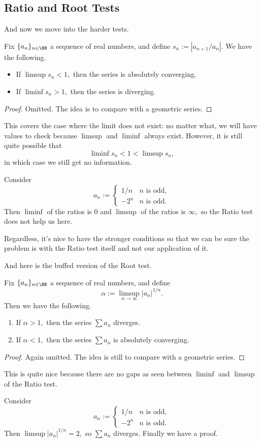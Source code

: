 \subsection{Ratio and Root Tests}
And now we move into the harder tests.
\begin{prop}
	Fix $\{a_n\}_{n\in\NN}$ a sequence of real numbers, and define $s_n:=|a_{n+1}/a_n|.$ We have the following.
	\begin{itemize}
		\item If $\limsup s_n<1,$ then the series is absolutely converging.
		\item If $\liminf s_n>1,$ then the series is diverging.
	\end{itemize}
\end{prop}
\begin{proof}
	Omitted. The idea is to compare with a geometric series.
\end{proof}
This covers the case where the limit does not exist: no matter what, we will have values to check because $\limsup$ and $\liminf$ always exist. However, it is still quite possible that
\[\liminf s_n<1<\limsup s_n,\]
in which case we still get no information.
\begin{nex}
	Consider
	\[a_n:=\begin{cases}
		1/n & n\text{ is odd}, \\
		-2^n & n\text{ is odd}.
	\end{cases}\]
	Then $\liminf$ of the ratios is $0$ and $\limsup$ of the ratios is $\infty,$ so the Ratio test does not help us here.
\end{nex}
Regardless, it's nice to have the stronger conditions so that we can be sure the problem is with the Ratio test itself and not our application of it.

And here is the buffed version of the Root test.
\begin{prop}
	Fix $\{a_n\}_{n\in\NN}$ a sequence of real numbers, and define
	\[\alpha:=\limsup_{n\to\infty}|a_n|^{1/n}.\]
	Then we have the following.
	\begin{enumerate}[label=(\alph*)]
		\item If $\alpha>1,$ then the series $\sum a_n$ diverges.
		\item If $\alpha<1,$ then the series $\sum a_n$ is absolutely converging.
	\end{enumerate}
\end{prop}
\begin{proof}
	Again omitted. The idea is still to compare with a geometric series.
\end{proof}
This is quite nice because there are no gaps as seen between $\liminf$ and $\limsup$ of the Ratio test.
\begin{example}
	Consider
	\[a_n:=\begin{cases}
		1/n & n\text{ is odd}, \\
		-2^n & n\text{ is odd}.
	\end{cases}\]
	Then $\limsup|a_n|^{1/n}=2,$ so $\sum a_n$ diverges. Finally we have a proof.
\end{example}

